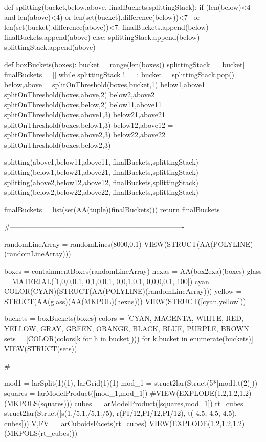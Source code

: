 def splitting(bucket,below,above, finalBuckets,splittingStack):
    if (len(below)<4 and len(above)<4) or len(set(bucket).difference(below))<7 \
        or len(set(bucket).difference(above))<7: 
        finalBuckets.append(below)
        finalBuckets.append(above)
    else: 
        splittingStack.append(below)
        splittingStack.append(above)

def boxBuckets(boxes):
    bucket = range(len(boxes))
    splittingStack = [bucket]
    finalBuckets = []
    while splittingStack != []:
        bucket = splittingStack.pop()
        below,above = splitOnThreshold(boxes,bucket,1)
        below1,above1 = splitOnThreshold(boxes,above,2)
        below2,above2 = splitOnThreshold(boxes,below,2)        
        below11,above11 = splitOnThreshold(boxes,above1,3)
        below21,above21 = splitOnThreshold(boxes,below1,3)        
        below12,above12 = splitOnThreshold(boxes,above2,3)
        below22,above22 = splitOnThreshold(boxes,below2,3)  
              
        splitting(above1,below11,above11, finalBuckets,splittingStack)
        splitting(below1,below21,above21, finalBuckets,splittingStack)
        splitting(above2,below12,above12, finalBuckets,splittingStack)
        splitting(below2,below22,above22, finalBuckets,splittingStack)
        
        finalBuckets = list(set(AA(tuple)(finalBuckets)))
    return finalBuckets

#-------------------------------------------------------------------------

randomLineArray = randomLines(8000,0.1)
VIEW(STRUCT(AA(POLYLINE)(randomLineArray)))

boxes = containmentBoxes(randomLineArray)
hexas = AA(box2exa)(boxes)
glass = MATERIAL([1,0,0,0.1,  0,1,0,0.1,  0,0,1,0.1, 0,0,0,0.1, 100])
cyan = COLOR(CYAN)(STRUCT(AA(POLYLINE)(randomLineArray)))
yellow = STRUCT(AA(glass)(AA(MKPOL)(hexas)))
VIEW(STRUCT([cyan,yellow]))

buckets = boxBuckets(boxes)
colors = [CYAN, MAGENTA, WHITE, RED, YELLOW, GRAY, GREEN, ORANGE, BLACK, BLUE, PURPLE, BROWN]
sets = [COLOR(colors[k%
            for h in bucket]))) for k,bucket in enumerate(buckets)]
VIEW(STRUCT(sets))

#-------------------------------------------------------------------------

mod1 = larSplit(1)(1), larGrid(1)(1)
mod_1 = struct2lar(Struct(5*[mod1,t(2)]))
squares = larModelProduct([mod_1,mod_1])
#VIEW(EXPLODE(1.2,1.2,1.2)(MKPOLS(squares)))
cubes = larModelProduct([squares,mod_1])
rt_cubes = struct2lar(Struct([s(1./5,1./5,1./5), r(PI/12,PI/12,PI/12), t(-4.5,-4.5,-4.5), cubes]))
V,FV = larCuboidsFacets(rt_cubes)
VIEW(EXPLODE(1.2,1.2,1.2)(MKPOLS(rt_cubes)))

